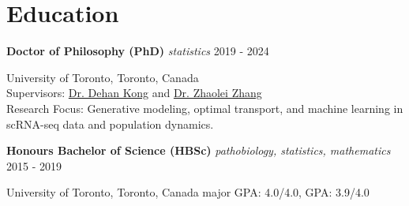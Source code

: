 \newcommand{\degree}[3]{
    \noindent\textbf{#1}  \emph{#2} \hfill #3 \break
}

\section{Education}
\degree{Doctor of Philosophy (PhD)}{statistics}{2019 - 2024}
University of Toronto, Toronto, Canada \\
Supervisors: \href{https://www.statistics.utoronto.ca/people/directories/all-faculty/dehan-kong}{Dr. Dehan Kong} and \href{http://sites.utoronto.ca/zhanglab/}{Dr. Zhaolei Zhang}\\
Research Focus: Generative modeling, optimal transport, and machine learning in scRNA-seq data and population dynamics.

\degree{Honours Bachelor of Science (HBSc)}{pathobiology, statistics, mathematics}{2015 - 2019}
University of Toronto, Toronto, Canada \hfill major GPA: 4.0/4.0, GPA: 3.9/4.0

\vspace{0.2em}